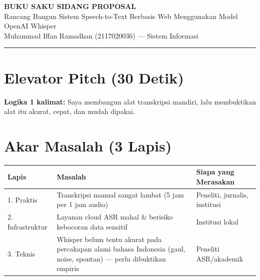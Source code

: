 \documentclass[11pt,a4paper]{article}
\begin{document}
\begin{center}
  {\LARGE\bfseries\color{primary} BUKU SAKU SIDANG PROPOSAL}\\[0.3em]
  {\large Rancang Bangun Sistem Speech-to-Text Berbasis Web Menggunakan Model OpenAI Whisper}\\[0.2em]
  {\normalsize Muhammad Iffan Ramadhan (2117020036) --- Sistem Informasi}
\end{center}

\vspace{0.5em}
\noindent\rule{\textwidth}{1pt}

\section{Elevator Pitch (30 Detik)}


\vspace{0.5em}
\textbf{Logika 1 kalimat:} Saya membangun alat transkripsi mandiri, lalu membuktikan alat itu akurat, cepat, dan mudah dipakai.

\section{Akar Masalah (3 Lapis)}

\begin{center}
\renewcommand{\arraystretch}{1.3}
\begin{tabular}{|p{2.2cm}|p{6.5cm}|p{4.5cm}|}
\hline
\rowcolor{lightgray} \textbf{Lapis} & \textbf{Masalah} & \textbf{Siapa yang Merasakan} \\
\hline
1. Praktis & Transkripsi manual sangat lambat (5 jam per 1 jam audio) & Peneliti, jurnalis, institusi \\
\hline
2. Infrastruktur & Layanan cloud ASR mahal \& berisiko kebocoran data sensitif & Institusi lokal \\
\hline
3. Teknis & Whisper belum tentu akurat pada percakapan alami bahasa Indonesia (gaul, noise, spontan) --- perlu dibuktikan empiris & Peneliti ASR/akademik \\
\hline
\end{tabular}
\end{center}
\end{document}
